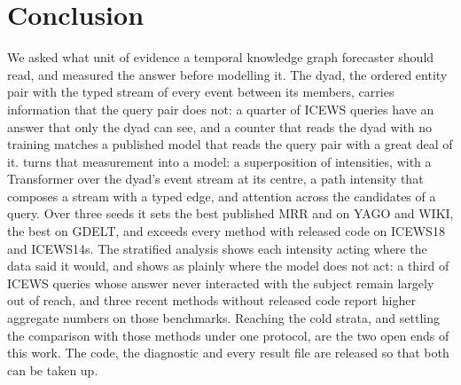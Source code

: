 \section{Conclusion}
\label{sec:conclusion}

We asked what unit of evidence a temporal knowledge graph forecaster should read, and measured the answer before modelling it. The dyad, the ordered entity pair with the typed stream of every event between its members, carries information that the query pair does not: a quarter of ICEWS queries have an answer that only the dyad can see, and a counter that reads the dyad with no training matches a published model that reads the query pair with a great deal of it. \model{} turns that measurement into a model: a superposition of intensities, with a Transformer over the dyad's event stream at its centre, a path intensity that composes a stream with a typed edge, and attention across the candidates of a query. Over three seeds it sets the best published MRR and \hone{} on YAGO and WIKI, the best \hone{} on GDELT, and exceeds every method with released code on ICEWS18 and ICEWS14s. The stratified analysis shows each intensity acting where the data said it would, and shows as plainly where the model does not act: a third of ICEWS queries whose answer never interacted with the subject remain largely out of reach, and three recent methods without released code report higher aggregate numbers on those benchmarks. Reaching the cold strata, and settling the comparison with those methods under one protocol, are the two open ends of this work. The code, the diagnostic and every result file are released so that both can be taken up.
